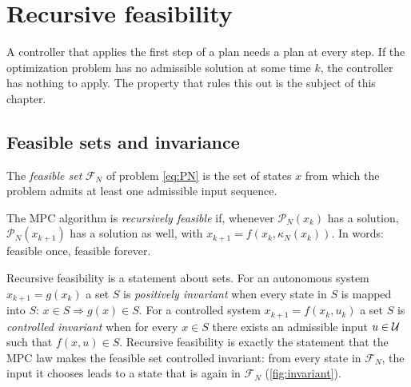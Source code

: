 \section{Recursive feasibility}
\label{sec:feasibility}

A controller that applies the first step of a plan needs a plan at every step. If the
optimization problem has no admissible solution at some time $k$, the controller has nothing
to apply. The property that rules this out is the subject of this chapter.

\subsection{Feasible sets and invariance}

\begin{definition}
The \emph{feasible set} $\mathcal{F}_N$ of problem \eqref{eq:PN} is the set of states $x$ from
which the problem admits at least one admissible input sequence.
\end{definition}

\begin{definition}
The MPC algorithm is \emph{recursively feasible} if, whenever $\mathcal{P}_N(x_k)$ has a solution,
$\mathcal{P}_N(x_{k+1})$ has a solution as well, with $x_{k+1} = f(x_k, \kappa_N(x_k))$. In
words: feasible once, feasible forever.
\end{definition}

Recursive feasibility is a statement about sets. For an autonomous system $x_{k+1} = g(x_k)$ a
set $S$ is \emph{positively invariant} when every state in $S$ is mapped into $S$: $x \in S
\Rightarrow g(x) \in S$. For a controlled system $x_{k+1} = f(x_k,u_k)$ a set $S$ is
\emph{controlled invariant} when for every $x \in S$ there exists an admissible input $u \in \mathcal{U}$
such that $f(x,u) \in S$. Recursive feasibility is exactly the statement that the MPC law makes
the feasible set controlled invariant: from every state in $\mathcal{F}_N$, the input it chooses
leads to a state that is again in $\mathcal{F}_N$ (\cref{fig:invariant}).

